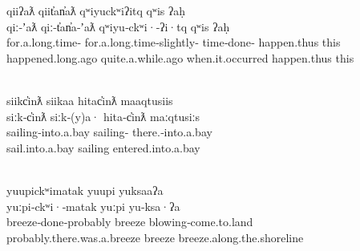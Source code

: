 \clearpage

\begin{exe}

  \ex\label{ex:3.18}
  \singlespacing
  \renewcommand{\eachwordfive}{\rule[-10pt]{0pt}{0pt}\rmfamily}

  \glllll qiiʔaƛ          qiit̓an̓aƛ                 qʷiyuckʷiʔitq qʷis ʔaḥ\\
          qiː‑ʼaƛ                  qiː‑t̓an̓a‑ʼaƛ                      qʷiyu‑ckʷi·‑ʔi·tq      qʷis          ʔaḥ\\
          for.a.long.time‑ for.a.long.time‑slightly‑ time‑done‑   happen.thus   this\\
          happened.long.ago        quite.a.while.ago                 when.it.occurred       happen.thus   this\\
                                                   { }                         \\
          \vfix

  \glllll siikc̓inƛ  siikaa   hitac̓inƛ         maaqtusiis\\
          siːk‑c̓inƛ          siːk‑(y)a·        hita‑c̓inƛ                 maːqtusiːs\\
          sailing‑into.a.bay sailing‑ there.‑into.a.bay \\
          sail.into.a.bay    sailing           entered.into.a.bay        \\
                                              \\
          \vfix

  \glllll yuupickʷimatak    yuupi yuksaaʔa\\
          yuːpi‑ckʷi·‑matak           yuːpi           yu‑ksa·ʔa\\
          breeze‑done‑probably        breeze          blowing‑come.to.land\\
          probably.there.was.a.breeze breeze          breeze.along.the.shoreline\\
                                     \\
          \vfix


\end{exe}
